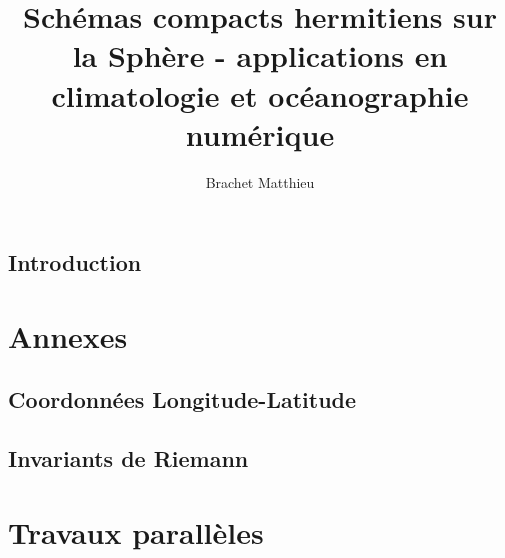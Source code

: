 \documentclass[10pt,a4paper]{book}
\author{Brachet Matthieu}
\title{Schémas compacts hermitiens sur la Sphère - applications en climatologie et océanographie numérique}
\begin{document}
\maketitle
\newpage
\tableofcontents
\listoffigures
\listoftables

\newpage
\section*{Introduction}
%









\chapter{Annexes}

\section{Coordonnées Longitude-Latitude}

\section{Invariants de Riemann}


\chapter{Travaux parallèles}





\end{document}
